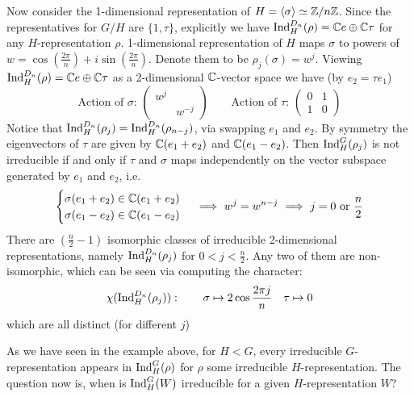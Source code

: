\documentclass{article}
\begin{document}
\begin{example}[Representations of $D_n$]
    Now consider the 1-dimensional representation of $H = \left\langle \sigma \right\rangle \simeq \mathbb{Z}/n\mathbb{Z}$. Since the representatives for $G/H$ are $\{1, \tau\}$, explicitly we have $\mathrm{Ind}_H^{D_n} (\rho) = \mathbb{C} e \oplus \mathbb{C} \tau$ for any $H$-representation $\rho$. 1-dimensional representation of $H$ maps $\sigma$ to powers of $w = \cos(\frac{2\pi}{n}) + i \sin(\frac{2\pi}{n})$. Denote them to be $\rho_j (\sigma) = w^j$. Viewing $\mathrm{Ind}_H^{D_n} (\rho) = \mathbb{C} e \oplus \mathbb{C} \tau$ as a 2-dimensional $\mathbb{C}$-vector space we have (by $e_2 = \tau e_1$)
    \[
        \text{Action of $\sigma$: }
        \begin{pmatrix}
            w^j & \\
            & w^{-j}
        \end{pmatrix}
        \qquad
        \text{Action of $\tau$: }
        \begin{pmatrix}
            0 & 1 \\
            1 & 0
        \end{pmatrix}
    \]
    Notice that $\mathrm{Ind}_H^{D_n} (\rho_j) = \mathrm{Ind}_H^{D_n} (\rho_{n-j})$, via swapping $e_1$ and $e_2$. By symmetry the eigenvectors of $\tau$ are given by $\mathbb{C}(e_1 + e_2)$ and $\mathbb{C}(e_1 - e_2)$. Then $\mathrm{Ind}_H^G (\rho_j)$ is not irreducible if and only if $\tau$ and $\sigma$ maps independently on the vector subspace generated by $e_1$ and $e_2$, i.e. 
    \[
        \begin{cases}
            \sigma(e_1 + e_2) \in \mathbb{C}(e_1 + e_2) \\
            \sigma(e_1 - e_2) \in \mathbb{C}(e_1 - e_2) \\
        \end{cases}
        \ \Longrightarrow\  
        w^j = w^{n-j}
        \ \Longrightarrow\ 
        j = 0 \text{ or } \frac{n}{2}
    \]
     There are $\left( \frac{n}{2} - 1 \right)$ isomorphic classes of irreducible 2-dimensional representations, namely $\mathrm{Ind}_H^{D_n} (\rho_j)$ for $0 < j < \frac{n}{2}$. Any two of them are non-isomorphic, which can be seen via computing the character:
    \[
        \chi (\mathrm{Ind}_H^{D_n} (\rho_j)): \qquad \sigma \mapsto 2 \cos \frac{2\pi j}{n} \quad \tau \mapsto 0
    \]
    which are all distinct (for different $j$)
\end{example}

As we have seen in the example above, for $H < G$, every irreducible $G$-representation appears in $\mathrm{Ind}_H^G(\rho)$ for $\rho$ some irreducible $H$-representation. The question now is, when is $\mathrm{Ind}_H^G(W)$ irreducible for a given $H$-representation $W$?
\end{document}

